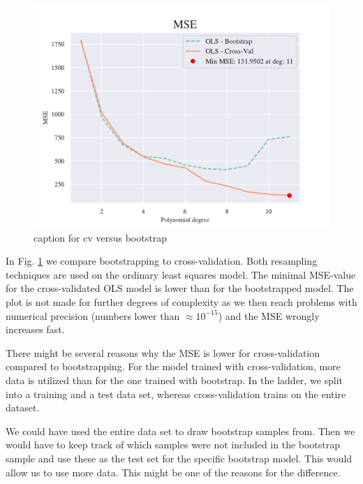 \begin{figure}[h!]
    \centering
    \includegraphics[width=1\linewidth]{project_1/figures/figures_in_report/CV_BS_OLS_terrain.pdf}
    \caption{caption for cv versus bootstrap}
    \label{cv_versus_bs}
\end{figure}


In Fig. \ref{cv_versus_bs} we compare bootstrapping to cross-validation. Both resampling techniques are used on the ordinary least squares model. The minimal MSE-value for the cross-validated OLS model is lower than for the bootstrapped model. The plot is not made for further degrees of complexity as we then reach problems with numerical precision (numbers lower than $\approx 10^{-15}$) and the MSE wrongly increases fast.  

There might be several reasons why the MSE is lower for cross-validation compared to bootstrapping. For the model trained with cross-validation, more data is utilized than for the one trained with bootstrap. In the ladder, we split into a training and a test data set, whereas cross-validation trains on the entire dataset.

We could have used the entire data set to draw bootstrap samples from. Then we would have to keep track of which samples were not included in the bootstrap sample and use these as the test set for the specific bootstrap model. This would allow us to use more data. This might be one of the reasons for the difference. 


